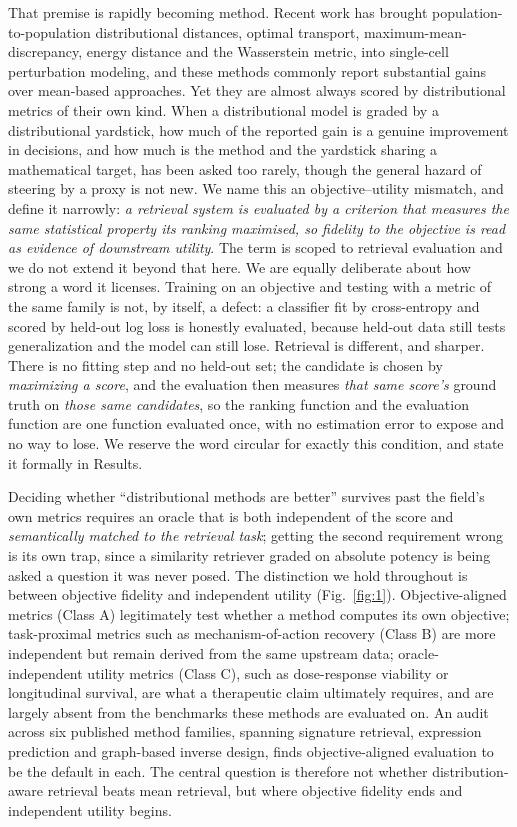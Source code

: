 \documentclass[11pt,letterpaper]{article}
\begin{document}
That premise is rapidly becoming method. Recent work has brought population-to-population distributional distances, optimal transport, maximum-mean-discrepancy, energy distance and the Wasserstein metric, into single-cell perturbation modeling, and these methods commonly report substantial gains over mean-based approaches. Yet they are almost always scored by distributional metrics of their own kind. When a distributional model is graded by a distributional yardstick, how much of the reported gain is a genuine improvement in decisions, and how much is the method and the yardstick sharing a mathematical target, has been asked too rarely\cite{ref3,ref13,ref15}, though the general hazard of steering by a proxy is not new\cite{MetricGaming}. We name this an objective--utility mismatch, and define it narrowly: \emph{a retrieval system is evaluated by a criterion that measures the same statistical property its ranking maximised, so fidelity to the objective is read as evidence of downstream utility}. The term is scoped to retrieval evaluation and we do not extend it beyond that here. We are equally deliberate about how strong a word it licenses. Training on an objective and testing with a metric of the same family is not, by itself, a defect: a classifier fit by cross-entropy and scored by held-out log loss is honestly evaluated, because held-out data still tests generalization and the model can still lose. Retrieval is different, and sharper. There is no fitting step and no held-out set; the candidate is chosen by \emph{maximizing a score}, and the evaluation then measures \emph{that same score's} ground truth on \emph{those same candidates}, so the ranking function and the evaluation function are one function evaluated once, with no estimation error to expose and no way to lose. We reserve the word circular for exactly this condition, and state it formally in Results.

Deciding whether ``distributional methods are better'' survives past the field's own metrics requires an oracle that is both independent of the score and \emph{semantically matched to the retrieval task}; getting the second requirement wrong is its own trap, since a similarity retriever graded on absolute potency is being asked a question it was never posed. The distinction we hold throughout is between objective fidelity and independent utility (Fig.~\ref{fig:1}). Objective-aligned metrics (Class A) legitimately test whether a method computes its own objective; task-proximal metrics such as mechanism-of-action recovery (Class B) are more independent but remain derived from the same upstream data; oracle-independent utility metrics (Class C), such as dose-response viability or longitudinal survival, are what a therapeutic claim ultimately requires, and are largely absent from the benchmarks these methods are evaluated on. An audit across six published method families, spanning signature retrieval\cite{ref1,ref2}, expression prediction\cite{ref4,ref5,ref6} and graph-based inverse design\cite{ref10,ref11,ref12}, finds objective-aligned evaluation to be the default in each. The central question is therefore not whether distribution-aware retrieval beats mean retrieval, but where objective fidelity ends and independent utility begins.
\end{document}
